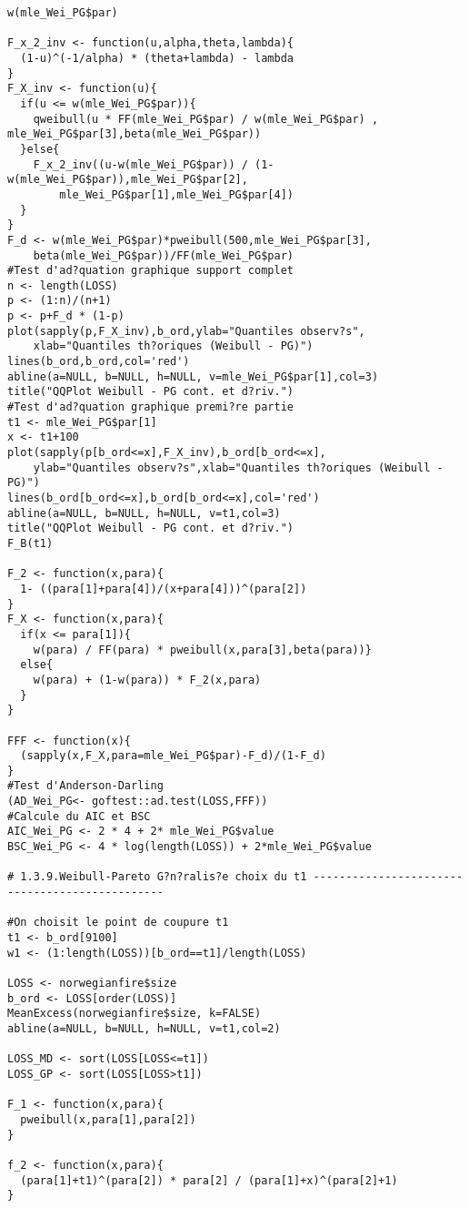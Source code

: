 \begin{verbatim}
w(mle_Wei_PG$par)

F_x_2_inv <- function(u,alpha,theta,lambda){
  (1-u)^(-1/alpha) * (theta+lambda) - lambda
}
F_X_inv <- function(u){
  if(u <= w(mle_Wei_PG$par)){
    qweibull(u * FF(mle_Wei_PG$par) / w(mle_Wei_PG$par) , mle_Wei_PG$par[3],beta(mle_Wei_PG$par))
  }else{
    F_x_2_inv((u-w(mle_Wei_PG$par)) / (1-w(mle_Wei_PG$par)),mle_Wei_PG$par[2],
    	mle_Wei_PG$par[1],mle_Wei_PG$par[4])
  }
}
F_d <- w(mle_Wei_PG$par)*pweibull(500,mle_Wei_PG$par[3],
	beta(mle_Wei_PG$par))/FF(mle_Wei_PG$par)
#Test d'ad?quation graphique support complet
n <- length(LOSS)
p <- (1:n)/(n+1)
p <- p+F_d * (1-p)
plot(sapply(p,F_X_inv),b_ord,ylab="Quantiles observ?s",
	xlab="Quantiles th?oriques (Weibull - PG)")
lines(b_ord,b_ord,col='red')
abline(a=NULL, b=NULL, h=NULL, v=mle_Wei_PG$par[1],col=3)
title("QQPlot Weibull - PG cont. et d?riv.")
#Test d'ad?quation graphique premi?re partie
t1 <- mle_Wei_PG$par[1]
x <- t1+100
plot(sapply(p[b_ord<=x],F_X_inv),b_ord[b_ord<=x],
	ylab="Quantiles observ?s",xlab="Quantiles th?oriques (Weibull - PG)")
lines(b_ord[b_ord<=x],b_ord[b_ord<=x],col='red')
abline(a=NULL, b=NULL, h=NULL, v=t1,col=3)
title("QQPlot Weibull - PG cont. et d?riv.")
F_B(t1)

F_2 <- function(x,para){
  1- ((para[1]+para[4])/(x+para[4]))^(para[2])
}
F_X <- function(x,para){
  if(x <= para[1]){
    w(para) / FF(para) * pweibull(x,para[3],beta(para))}
  else{
    w(para) + (1-w(para)) * F_2(x,para)
  }
}

FFF <- function(x){
  (sapply(x,F_X,para=mle_Wei_PG$par)-F_d)/(1-F_d)
}
#Test d'Anderson-Darling
(AD_Wei_PG<- goftest::ad.test(LOSS,FFF))
#Calcule du AIC et BSC
AIC_Wei_PG <- 2 * 4 + 2* mle_Wei_PG$value
BSC_Wei_PG <- 4 * log(length(LOSS)) + 2*mle_Wei_PG$value

# 1.3.9.Weibull-Pareto G?n?ralis?e choix du t1 -----------------------------------------------

#On choisit le point de coupure t1
t1 <- b_ord[9100]
w1 <- (1:length(LOSS))[b_ord==t1]/length(LOSS)

LOSS <- norwegianfire$size
b_ord <- LOSS[order(LOSS)]
MeanExcess(norwegianfire$size, k=FALSE)
abline(a=NULL, b=NULL, h=NULL, v=t1,col=2)

LOSS_MD <- sort(LOSS[LOSS<=t1])
LOSS_GP <- sort(LOSS[LOSS>t1])

F_1 <- function(x,para){
  pweibull(x,para[1],para[2])
}

f_2 <- function(x,para){
  (para[1]+t1)^(para[2]) * para[2] / (para[1]+x)^(para[2]+1)
}



\end{verbatim}
